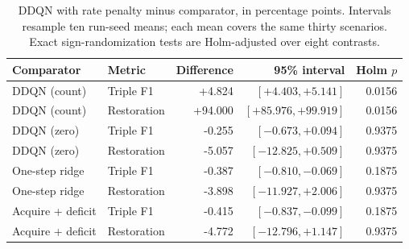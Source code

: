 \begin{table}[t]
\centering
\caption{DDQN with rate penalty minus comparator, in percentage points. Intervals resample ten run-seed means; each mean covers the same thirty scenarios. Exact sign-randomization tests are Holm-adjusted over eight contrasts.}
\label{tab:reward_validation_tests}
\footnotesize
\setlength{\tabcolsep}{3pt}
\begin{tabular*}{\textwidth}{@{\extracolsep{\fill}}llrrr@{}}
\toprule
Comparator & Metric & Difference & 95\% interval & Holm $p$ \\
\midrule
DDQN (count) & Triple F1 & +4.824 & $[+4.403,+5.141]$ & 0.0156 \\
DDQN (count) & Restoration & +94.000 & $[+85.976,+99.919]$ & 0.0156 \\
DDQN (zero) & Triple F1 & -0.255 & $[-0.673,+0.094]$ & 0.9375 \\
DDQN (zero) & Restoration & -5.057 & $[-12.825,+0.509]$ & 0.9375 \\
One-step ridge & Triple F1 & -0.387 & $[-0.810,-0.069]$ & 0.1875 \\
One-step ridge & Restoration & -3.898 & $[-11.927,+2.006]$ & 0.9375 \\
Acquire + deficit & Triple F1 & -0.415 & $[-0.837,-0.099]$ & 0.1875 \\
Acquire + deficit & Restoration & -4.772 & $[-12.796,+1.147]$ & 0.9375 \\
\bottomrule
\end{tabular*}
\end{table}
